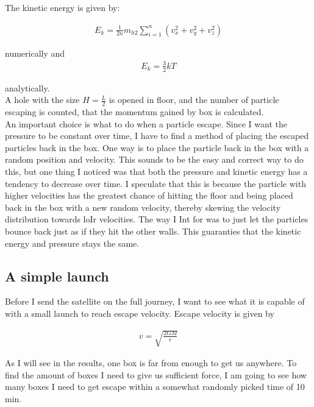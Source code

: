 \documentclass[a4paper, 10pt]{article}
\begin{document}
The kinetic energy is given by:

\begin{align}
E_k = \frac{1}{2n}m_{h2}\sum\limits_{i=1}^{n}(v_x^{2} + v_y^{2} + v_z^{2})
\end{align}

numerically and
\begin{align}
 E_k = \frac{3}{2}kT
\end{align}

analytically. \\

A hole with the size $H =\frac{L}{2}$ is opened in floor, and the number of particle escaping is counted, that the momentum gained by box is calculated.\\

An important choice is what to do when a particle escape. Since I want the pressure to be constant over time, I have to find a method of placing the escaped particles back in the box. One way is to place the particle back in the box with a random position and velocity. This sounds to be the easy and correct way to do this, but one thing I noticed was that both the pressure and kinetic energy has a tendency to decrease over time. I speculate that this is because the particle with higher velocities has the greatest chance of hitting the floor and being placed back in the box with a new random velocity, thereby skewing the velocity distribution towards loIr velocities. The way I Int for was to just let the particles bounce back just as if they hit the other walls. This guaranties that the kinetic energy and pressure stays the same. 

\subsection{A simple launch}

Before I send the satellite on the full journey, I want to see what it is capable of with a small launch to reach escape velocity. Escape velocity is given by 

\begin{align}\label{eq:escape}
v = \sqrt{\frac{2GM}{r}}
\end{align}

As I will see in the results, one box is far from enough to get us anywhere. To find the amount of boxes I need to give us sufficient force, I am going to see how many boxes I need to get escape within a somewhat randomly picked time of 10 min.
\end{document}
